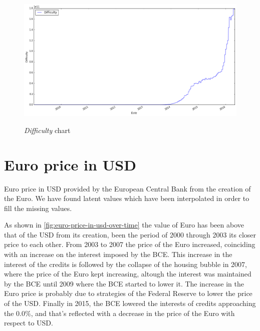 \begin{figure}[bth]
  \myfloatalign
  {\includegraphics[width=1\linewidth]
    {gfx/difficulty-over-time}}
  \caption{\textit{Difficulty} chart}
  \label{fig:difficulty-over-time}
\end{figure}


\section{Euro price in USD}
\label{sec:euro-price-in-usd}


Euro price in USD provided by the European Central Bank from the
creation of the Euro. We have found latent values which have been
interpolated in order to fill the missing values.

As shown in \autoref{fig:euro-price-in-usd-over-time} the value of Euro
has been above that of the USD from its creation, been the period of
2000 through 2003 its closer price to each other. From 2003 to 2007
the price of the Euro increased, coinciding with an increase on the
interest imposed by the BCE. This increase in the interest of the
credits is followed by the collapse of the housing bubble in 2007,
where the price of the Euro kept increasing, altough the interest was
maintained by the BCE until 2009 where the BCE started to lower it.
The increase in the Euro price is probably due to strategies of the
Federal Reserve to lower the price of the USD. Finally in 2015, the
BCE lowered the interests of credits approaching the $0.0\%$, and
that's reflected with a decrease in the price of the Euro with respect
to USD.


